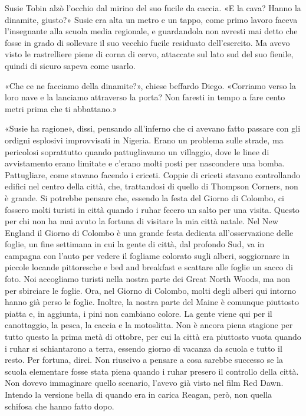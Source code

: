 Susie Tobin alzò l'occhio dal mirino del suo fucile da caccia. «E la
cava? Hanno la dinamite, giusto?» Susie era alta un metro e un tappo,
come primo lavoro faceva l'insegnante alla scuola media regionale, e
guardandola non avresti mai detto che fosse in grado di sollevare il suo
vecchio fucile residuato dell'esercito. Ma avevo visto le rastrelliere
piene di corna di cervo, attaccate sul lato sud del suo fienile, quindi
di sicuro sapeva come usarlo.

«Che ce ne facciamo della dinamite?», chiese beffardo Diego. «Corriamo
verso la loro nave e la lanciamo attraverso la porta? Non faresti in
tempo a fare cento metri prima che ti abbattano.»

«Susie ha ragione», dissi, pensando all'inferno che ci avevano fatto
passare con gli ordigni esplosivi improvvisati in Nigeria. Erano un
problema sulle strade, ma pericolosi soprattutto quando pattugliavamo un
villaggio, dove le linee di avvistamento erano limitate e c'erano molti
posti per nascondere una bomba. Pattugliare, come stavano facendo i
criceti. Coppie di criceti stavano controllando edifici nel centro della
città, che, trattandosi di quello di Thompson Corners, non è grande. Si
potrebbe pensare che, essendo la festa del Giorno di Colombo, ci fossero
molti turisti in città quando i ruhar fecero un salto per una visita.
Questo per chi non ha mai avuto la fortuna di visitare la mia città
natale. Nel New England il Giorno di Colombo è una grande festa dedicata
all'osservazione delle foglie, un fine settimana in cui la gente di
città, dal profondo Sud, va in campagna con l'auto per vedere il
fogliame colorato sugli alberi, soggiornare in piccole locande
pittoresche e bed and breakfast e scattare alle foglie un sacco di foto.
Noi accogliamo turisti nella nostra parte dei Great North Woods, ma non
per sbirciare le foglie. Ora, nel Giorno di Colombo, molti degli alberi
qui intorno hanno già perso le foglie. Inoltre, la nostra parte del
Maine è comunque piuttosto piatta e, in aggiunta, i pini non cambiano
colore. La gente viene qui per il canottaggio, la pesca, la caccia e la
motoslitta. Non è ancora piena stagione per tutto questo la prima metà
di ottobre, per cui la città era piuttosto vuota quando i ruhar si
schiantarono a terra, essendo giorno di vacanza da scuola e tutto il
resto. Per fortuna, direi. Non riuscivo a pensare a cosa sarebbe
successo se la scuola elementare fosse stata piena quando i ruhar
presero il controllo della città. Non dovevo immaginare quello scenario,
l'avevo già visto nel film Red Dawn. Intendo la versione bella di quando
era in carica Reagan, però, non quella schifosa che hanno fatto dopo.

